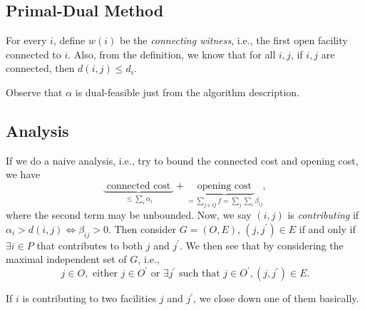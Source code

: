 \subsection{Primal-Dual Method}


For every \(i\), define \(w(i)\) be the \emph{connecting witness}, i.e., the first open facility connected to \(i\). Also, from the definition, we know that for all \(i, j\), if \(i, j\) are connected, then \(d(i, j) \leq d_i\).

\begin{note}
	Observe that \(\alpha \) is dual-feasible just from the algorithm description.
\end{note}

\subsection{Analysis}

If we do a naive analysis, i.e., try to bound the connected cost and opening cost, we have
\[
	\underbrace{\text{ connected cost }}_{\leq \sum_{i}\alpha _i} + \underbrace{\text{ opening cost } }_{= \sum_{j\in Q}f = \sum_{j}\sum_{i} \beta _{ij} },
\]
where the second term may be unbounded. Now, we say \((i, j)\) is \emph{contributing} if \(\alpha _i > d(i, j) \iff \beta _{ij} > 0\). Then consider \(G = (O, E)\), \((j, j^\prime )\in E\) if and only if \(\exists i\in P\) that contributes to both \(j\) and \(j^\prime \). We then see that by considering the maximal independent set of \(G\), i.e.,
\[
	j\in O, \text{ either } j\in O^\prime \text{ or } \exists j^\prime \text{ such that } j\in O^\prime , (j, j^\prime )\in E.
\]
\begin{intuition}
	If \(i\) is contributing to two facilities \(j\) and \(j^\prime \), we close down one of them basically.
\end{intuition}

